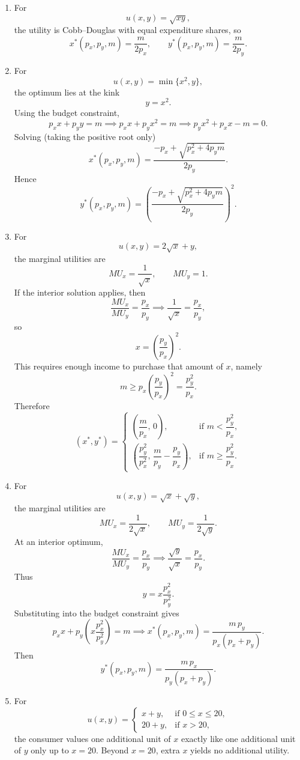 \documentclass[12pt,a4paper]{article}
\begin{document}
\begin{enumerate}[label=(\arabic*)]
  \item For
  \[
    u(x,y)=\sqrt{xy},
  \]
  the utility is Cobb--Douglas with equal expenditure shares, so
  \[
    x^*(p_x,p_y,m)=\frac{m}{2p_x},
    \qquad
    y^*(p_x,p_y,m)=\frac{m}{2p_y}.
  \]

  \item For
  \[
    u(x,y)=\min\{x^2,y\},
  \]
  the optimum lies at the kink
  \[
    y=x^2.
  \]
  Using the budget constraint,
  \[
    p_xx+p_yy=m
    \implies
    p_xx+p_yx^2=m
    \implies
    p_yx^2+p_xx-m=0.
  \]
  Solving (taking the positive root only)
  \[
    x^*(p_x,p_y,m)=\frac{-p_x+\sqrt{p_x^2+4p_y m}}{2p_y}.
  \]
  Hence
  \[
    y^*(p_x,p_y,m)=\left(\frac{-p_x+\sqrt{p_x^2+4p_y m}}{2p_y}\right)^2.
  \]

  \item For
  \[
    u(x,y)=2\sqrt{x}+y,
  \]
  the marginal utilities are
  \[
    MU_x=\frac{1}{\sqrt{x}},
    \qquad
    MU_y=1.
  \]
  If the interior solution applies, then
  \[
    \frac{MU_x}{MU_y}=\frac{p_x}{p_y}
    \implies
    \frac{1}{\sqrt{x}}=\frac{p_x}{p_y},
  \]
  so
  \[
    x=\left(\frac{p_y}{p_x}\right)^2.
  \]
  This requires enough income to purchase that amount of \(x\), namely
  \[
    m\ge p_x\left(\frac{p_y}{p_x}\right)^2=\frac{p_y^2}{p_x}.
  \]
  Therefore
  \[
    (x^*,y^*)=
    \begin{cases}
      \left(\dfrac{m}{p_x},\,0\right), & \text{if }m<\dfrac{p_y^2}{p_x},\\[8pt]
      \left(\dfrac{p_y^2}{p_x^2},\,\dfrac{m}{p_y}-\dfrac{p_y}{p_x}\right), & \text{if }m\ge \dfrac{p_y^2}{p_x}.
    \end{cases}
  \]

  \item For
  \[
    u(x,y)=\sqrt{x}+\sqrt{y},
  \]
  the marginal utilities are
  \[
    MU_x=\frac{1}{2\sqrt{x}},
    \qquad
    MU_y=\frac{1}{2\sqrt{y}}.
  \]
  At an interior optimum,
  \[
    \frac{MU_x}{MU_y}=\frac{p_x}{p_y}
    \implies
    \frac{\sqrt{y}}{\sqrt{x}}=\frac{p_x}{p_y}.
  \]
  Thus
  \[
    y=x\frac{p_x^2}{p_y^2}.
  \]
  Substituting into the budget constraint gives
  \[
    p_xx+p_y\left(x\frac{p_x^2}{p_y^2}\right)=m
    \implies
    x^*(p_x,p_y,m)=\frac{m\,p_y}{p_x(p_x+p_y)}.
  \]
  Then
  \[
    y^*(p_x,p_y,m)=\frac{m\,p_x}{p_y(p_x+p_y)}.
  \]

  \item For
  \[
    u(x,y)=
    \begin{cases}
      x+y, & \text{if } 0\le x\le 20,\\
      20+y, & \text{if } x>20,
    \end{cases}
  \]
  the consumer values one additional unit of \(x\) exactly like one additional unit of \(y\) only up to \(x=20\). Beyond \(x=20\), extra \(x\) yields no additional utility.


\end{enumerate}
\end{document}
